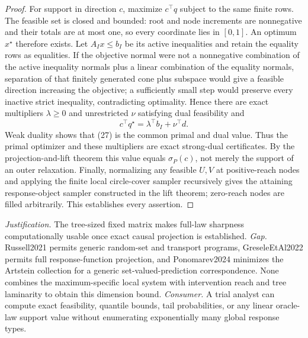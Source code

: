 \documentclass{article}
\begin{document}
\begin{proof}
For support in direction \(c\), maximize \(c^\top q\) subject to the same finite rows.  The feasible set is closed and bounded: root and node increments are nonnegative and their totals are at most one, so every coordinate lies in \([0,1]\).  An optimum \(x^\star\) therefore exists.  Let \(A_Ix\leq b_I\) be its active inequalities and retain the equality rows as equalities.  If the objective normal were not a nonnegative combination of the active inequality normals plus a linear combination of the equality normals, separation of that finitely generated cone plus subspace would give a feasible direction increasing the objective; a sufficiently small step would preserve every inactive strict inequality, contradicting optimality.  Hence there are exact multipliers \(\lambda\geq0\) and unrestricted \(\nu\) satisfying dual feasibility and
\[
 c^\top q^\star=\lambda^\top b_I+\nu^\top d.             \tag{27}
\]
Weak duality shows that (27) is the common primal and dual value.  Thus the primal optimizer and these multipliers are exact strong-dual certificates.  By the projection-and-lift theorem this value equals \(\sigma_P(c)\), not merely the support of an outer relaxation.  Finally, normalizing any feasible \(U,V\) at positive-reach nodes and applying the finite local circle-cover sampler recursively gives the attaining response-object sampler constructed in the lift theorem; zero-reach nodes are filled arbitrarily.  This establishes every assertion.
\end{proof}
\par\smallskip\noindent \textit{Justification.} The tree-sized fixed matrix makes full-law sharpness computationally usable once exact causal projection is established. \textit{Gap.} Russell2021 permits generic random-set and transport programs, GreseleEtAl2022 permits full response-function projection, and Ponomarev2024 minimizes the Artstein collection for a generic set-valued-prediction correspondence. None combines the maximum-specific local system with intervention reach and tree laminarity to obtain this dimension bound. \textit{Consumer.} A trial analyst can compute exact feasibility, quantile bounds, tail probabilities, or any linear oracle-law support value without enumerating exponentially many global response types.
\end{document}
